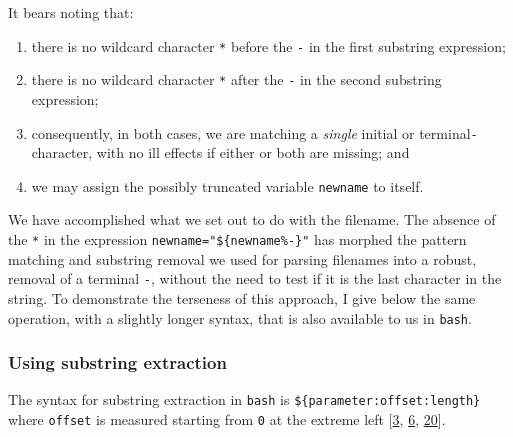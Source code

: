 \documentclass[
  a4paper,
]{article}
\begin{document}
It bears noting that:

\begin{enumerate}
\def\labelenumi{(\alph{enumi})}
\item
  there is no wildcard character \texttt{*} before the \texttt{-} in the
  first substring expression;
\item
  there is no wildcard character \texttt{*} after the \texttt{-} in the
  second substring expression;
\item
  consequently, in both cases, we are matching a \emph{single} initial
  or terminal\texttt{-} character, with no ill effects if either or both
  are missing; and
\item
  we may assign the possibly truncated variable \texttt{newname} to
  itself.
\end{enumerate}

We have accomplished what we set out to do with the filename. The
absence of the \texttt{*} in the expression
\texttt{newname="\$\{newname\%-\}"} has morphed the pattern matching and
substring removal we used for parsing filenames into a robust, removal
of a terminal \texttt{-}, without the need to test if it is the last
character in the string. To demonstrate the terseness of this approach,
I give below the same operation, with a slightly longer syntax, that is
also available to us in \texttt{bash}.

\hypertarget{using-substring-extraction}{%
\subsubsection{Using substring
extraction}\label{using-substring-extraction}}

The syntax for substring extraction in \texttt{bash} is
\texttt{\$\{parameter:offset:length\}} where \texttt{offset} is measured
starting from \texttt{0} at the extreme left
{[}\protect\hyperlink{ref-parametersubs}{3},
\protect\hyperlink{ref-stringops}{6},
\protect\hyperlink{ref-substring}{20}{]}.
\end{document}
